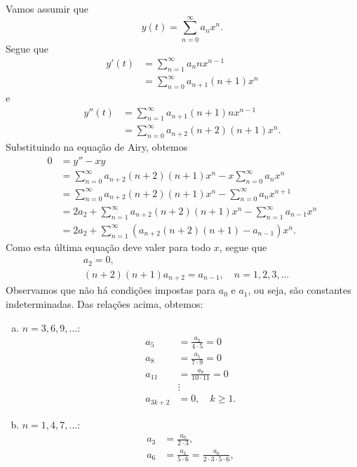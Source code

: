 \begin{ex}
  Vamos assumir que
  \begin{equation}
    y(t) = \sum_{n=0}^{\infty} a_nx^n.
  \end{equation}
  Segue que
  \begin{align}
    y'(t) &= \sum_{n=1}^\infty a_{n}nx^{n-1} \\
          &= \sum_{n=0}^\infty a_{n+1}(n+1)x^n
  \end{align}
  e
  \begin{align}
    y''(t) &= \sum_{n=1}^\infty a_{n+1}(n+1)nx^{n-1} \\
           &= \sum_{n=0}^\infty a_{n+2}(n+2)(n+1)x^n.
  \end{align}
  Substituindo na equação de Airy, obtemos
  \begin{align}
    0 &= y'' - xy \\
      &= \sum_{n=0}^\infty a_{n+2}(n+2)(n+1)x^n - x\sum_{n=0}^\infty a_{n}x^n \\
      &= \sum_{n=0}^\infty a_{n+2}(n+2)(n+1)x^n - \sum_{n=0}^\infty a_{n}x^{n+1} \\
      &= 2a_2 + \sum_{n=1}^\infty a_{n+2}(n+2)(n+1)x^n - \sum_{n=1}^\infty a_{n-1}x^{n} \\
      &= 2a_2 + \sum_{n=1}^\infty (a_{n+2}(n+2)(n+1) - a_{n-1})x^n.
  \end{align}
  Como esta última equação deve valer para todo $x$, segue que
  \begin{align}
    & a_2 = 0, \\
    & (n+2)(n+1)a_{n+2} = a_{n-1},\quad n=1, 2, 3, \ldots
  \end{align}
  Observamos que não há condições impostas para $a_0$ e $a_1$, ou seja, são constantes indeterminadas. Das relações acima, obtemos:
  \begin{enumerate}[a)]
  \item $n = 3, 6, 9, \ldots$:
    \begin{align}
      a_5 &= \frac{a_2}{4\cdot 5} = 0 \\
      a_8 &= \frac{a_5}{7\cdot 9} = 0 \\
      a_{11} &= \frac{a_{8}}{10\cdot 11} = 0 \\
          &\vdots \\
      a_{3k+2} &= 0,\quad k\geq 1.
    \end{align}
  \item $n = 1, 4, 7, \ldots$:
    \begin{align}
      a_3 &= \frac{a_0}{2\cdot 3}, \\
      a_6 &= \frac{a_3}{5\cdot 6} = \frac{a_0}{2\cdot 3\cdot 5\cdot 6}, \\

\end{align}
\end{enumerate}
\end{ex}
